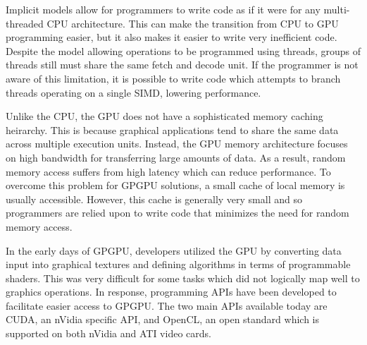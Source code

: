 Implicit models allow for programmers to write code as if it were for any multi-threaded CPU architecture. This can make the transition from CPU to GPU programming easier, but it also makes it easier to write very inefficient code. Despite the model allowing operations to be programmed using threads, groups of threads still must share the same fetch and decode unit. If the programmer is not aware of this limitation, it is possible to write code which attempts to branch threads operating on a single SIMD, lowering performance.

Unlike the CPU, the GPU does not have a sophisticated memory caching heirarchy. This is because graphical applications tend to share the same data across multiple execution units. Instead, the GPU memory architecture focuses on high bandwidth for transferring large amounts of data. As a result, random memory access suffers from high latency which can reduce performance. To overcome this problem for GPGPU solutions, a small cache of local memory is usually accessible. However, this cache is generally very small and so programmers are relied upon to write code that minimizes the need for random memory access.

In the early days of GPGPU, developers utilized the GPU by converting data input into graphical textures and defining algorithms in terms of programmable shaders. This was very difficult for some tasks which did not logically map well to graphics operations. In response, programming APIs have been developed to facilitate easier access to GPGPU. The two main APIs available today are CUDA, an nVidia specific API, and OpenCL, an open standard which is supported on both nVidia and ATI video cards.
